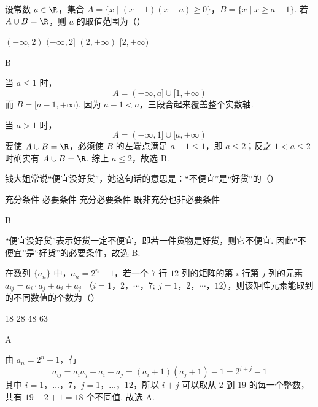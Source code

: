 \begin{problem}
设常数 \(a \in \R\)，集合 \(A=\{x\mid(x-1)(x-a)\geqslant 0\}\)，\(B=\{x\mid x\geqslant a-1\}\). 若 \(A\cup B=\R\)，则 \(a\) 的取值范围为（\quad）

\choices
    {\((-\infty,2)\)}
    {\((-\infty,2]\)}
    {\((2,+\infty)\)}
    {\([2,+\infty)\)}
\begin{answer}
B
\end{answer}

\begin{solution}
当 \(a\leqslant1\) 时，
\[
A=(-\infty,a]\cup[1,+\infty)
\]
而 \(B=[a-1,+\infty)\). 因为 \(a-1<a\)，三段合起来覆盖整个实数轴.

当 \(a>1\) 时，
\[
A=(-\infty,1]\cup[a,+\infty)
\]
要使 \(A\cup B=\R\)，必须使 \(B\) 的左端点满足 \(a-1\leqslant1\)，即 \(a\leqslant2\)；反之 \(1<a\leqslant2\) 时确实有 \(A\cup B=\R\). 综上 \(a\leqslant2\)，故选 B.
\end{solution}
\end{problem}

\begin{problem}
钱大姐常说“便宜没好货”，她这句话的意思是：“不便宜”是“好货”的（\quad）

\choices
    {充分条件}
    {必要条件}
    {充分必要条件}
    {既非充分也非必要条件}
\begin{answer}
B
\end{answer}

\begin{solution}
“便宜没好货”表示好货一定不便宜，即若一件货物是好货，则它不便宜. 因此“不便宜”是“好货”的必要条件，故选 B.
\end{solution}
\end{problem}

\begin{problem}
在数列 \(\{a_n\}\) 中，\(a_n=2^n-1\)，若一个 \(7\) 行 \(12\) 列的矩阵的第 \(i\) 行第 \(j\) 列的元素 \(a_{ij}=a_i\cdot a_j+a_i+a_j\) （\(i=1\)，\(2\)，\(\cdots\)，\(7;\ j=1\)，\(2\)，\(\cdots\)，\(12\)），则该矩阵元素能取到的不同数值的个数为（\quad）

\choices
    {18}
    {28}
    {48}
    {63}
\begin{answer}
A
\end{answer}

\begin{solution}
由 \(a_n=2^n-1\)，有
\[
a_{ij}=a_i a_j+a_i+a_j=(a_i+1)(a_j+1)-1=2^{i+j}-1
\]
其中 \(i=1\)，\(\ldots\)，\(7\)，\(j=1\)，\(\ldots\)，\(12\)，所以 \(i+j\) 可以取从 \(2\) 到 \(19\) 的每一个整数，共有 \(19-2+1=18\) 个不同值. 故选 A.
\end{solution}
\end{problem}

